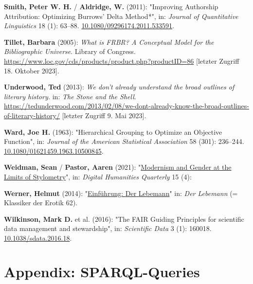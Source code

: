 \documentclass[
  12pt,
  letterpaper,
  DIV=11,
  numbers=noendperiod]{scrreprt}
\newlength{\cslhangindent}
\newenvironment{CSLReferences}[2] %
 {\begin{list}{}{%
  \setlength{\itemindent}{0pt}
  \setlength{\leftmargin}{0pt}
  \setlength{\parsep}{0pt}
  \ifodd #1
   \setlength{\leftmargin}{\cslhangindent}
   \setlength{\itemindent}{-1\cslhangindent}
  \fi
  \setlength{\itemsep}{#2\baselineskip}}}
 {\end{list}}
\begin{document}
\begin{CSLReferences}{1}{0}
\textbf{Smith, Peter W. H.} / \textbf{Aldridge, W.} (2011): "Improving
{Authorship} {Attribution}: {Optimizing} {Burrows}' {Delta} {Method}*",
in: \emph{Journal of Quantitative Linguistics} 18 (1): 63--88.
\href{https://doi.org/10.1080/09296174.2011.533591}{10.1080/09296174.2011.533591}.

\textbf{Tillet, Barbara} (2005): \emph{What is {FRBR}? {A} {Conceptual}
{Model} for the {Bibliographic} {Universe}}. Library of Congress.
\url{https://www.loc.gov/cds/products/product.php?productID=86}
{[}letzter Zugriff 18. Oktober 2023{]}.

\textbf{Underwood, Ted} (2013): \emph{We don't already understand the
broad outlines of literary history.} in: \emph{The Stone and the Shell}.
\url{https://tedunderwood.com/2013/02/08/we-dont-already-know-the-broad-outlines-of-literary-history/}
{[}letzter Zugriff 9. Mai 2023{]}.

\textbf{Ward, Joe H.} (1963): "Hierarchical {Grouping} to {Optimize} an
{Objective} {Function}", in: \emph{Journal of the American Statistical
Association} 58 (301): 236--244.
\href{https://doi.org/10.1080/01621459.1963.10500845}{10.1080/01621459.1963.10500845}.

\textbf{Weidman, Sean} / \textbf{Pastor, Aaren} (2021):
"\href{https://www.digitalhumanities.org/dhq/vol/15/4/000566/000566.html}{Modernism
and {Gender} at the {Limits} of {Stylometry}}", in: \emph{Digital
Humanities Quarterly} 15 (4):

\textbf{Werner, Helmut} (2014):
"\href{https://seyerlein.de/shop/item/9783944964744/klassiker-der-erotik-62-der-lebemann-von-andrea-de-nerciat-e-book-epub}{Einführung:
{Der} {Lebemann}}" in: \emph{Der {Lebemann}} (= Klassiker der {Erotik}
62).

\textbf{Wilkinson, Mark D.} et al. (2016): "The {FAIR} {Guiding}
{Principles} for scientific data management and stewardship", in:
\emph{Scientific Data} 3 (1): 160018.
\href{https://doi.org/10.1038/sdata.2016.18}{10.1038/sdata.2016.18}.

\end{CSLReferences}

\section{Appendix: SPARQL-Queries}\label{appendix-sparql-queries-2}
\end{document}
